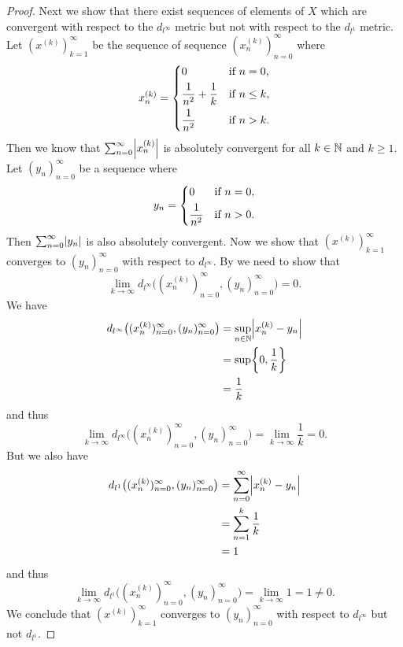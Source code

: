 \begin{proof}
  Next we show that there exist sequences of elements of \(X\) which are convergent with respect to the \(d_{l^\infty}\) metric but not with respect to the \(d_{l^1}\) metric.
  Let \((x^{(k)})_{k = 1}^\infty\) be the sequence of sequence \((x_n^{(k)})_{n = 0}^\infty\) where
  \[
    x_n^{(k)} = \begin{dcases}
      0                             & \text{if } n = 0,    \\
      \dfrac{1}{n^2} + \dfrac{1}{k} & \text{if } n \leq k, \\
      \dfrac{1}{n^2}                & \text{if } n > k.
    \end{dcases}
  \]
  Then we know that \(\sum_{n = 0}^\infty \abs{x_n^{(k)}}\) is absolutely convergent for all \(k \in \mathbb{N}\) and \(k \geq 1\).
  Let \((y_n)_{n = 0}^\infty\) be a sequence where
  \[
    y_n = \begin{dcases}
      0              & \text{if } n = 0, \\
      \dfrac{1}{n^2} & \text{if } n > 0.
    \end{dcases}
  \]
  Then \(\sum_{n = 0}^\infty \abs{y_n}\) is also absolutely convergent.
  Now we show that \((x^{(k)})_{k = 1}^\infty\) converges to \((y_n)_{n = 0}^\infty\) with respect to \(d_{l^\infty}\).
  By  we need to show that
  \[
    \lim_{k \to \infty} d_{l^\infty}\big((x_n^{(k)})_{n = 0}^\infty, (y_n)_{n = 0}^\infty\big) = 0.
  \]
  We have
  \begin{align*}
    d_{l^\infty}\big((x_n^{(k)})_{n = 0}^\infty, (y_n)_{n = 0}^\infty\big) & = \sup_{n \in \N} \abs{x_n^{(k)} - y_n} \\
                                                                           & = \sup \set{0, \dfrac{1}{k}}            \\
                                                                           & = \dfrac{1}{k}
  \end{align*}
  and thus
  \[
    \lim_{k \to \infty} d_{l^\infty}\big((x_n^{(k)})_{n = 0}^\infty, (y_n)_{n = 0}^\infty\big) = \lim_{k \to \infty} \dfrac{1}{k} = 0.
  \]
  But we also have
  \begin{align*}
    d_{l^1}\big((x_n^{(k)})_{n = 0}^\infty, (y_n)_{n = 0}^\infty\big) & = \sum_{n = 0}^\infty \abs{x_n^{(k)} - y_n} \\
                                                                      & = \sum_{n = 1}^k \dfrac{1}{k}               \\
                                                                      & = 1
  \end{align*}
  and thus
  \[
    \lim_{k \to \infty} d_{l^1}\big((x_n^{(k)})_{n = 0}^\infty, (y_n)_{n = 0}^\infty\big) = \lim_{k \to \infty} 1 = 1 \neq 0.
  \]
  We conclude that \((x^{(k)})_{k = 1}^\infty\) converges to \((y_n)_{n = 0}^\infty\) with respect to \(d_{l^\infty}\) but not \(d_{l^1}\).


\end{proof}
